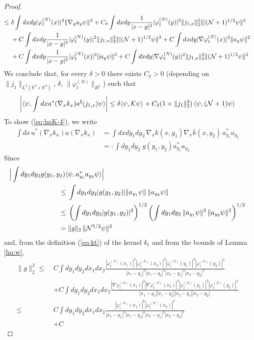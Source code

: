\documentclass[11pt,a4paper,DIV11]{scrartcl}	%
\newcommand{\bR}{{\mathbb R}}
\newcommand{\cK}{{\cal K}}
\newcommand{\cN}{{\cal N}}
\begin{document}
\begin{proof}
\[\begin{split}
\leq \; &\delta \int dx dy |\varphi_t^{(N)} (x)|^2 \| \nabla_y a_y \psi \|^2 + C_\delta \int dx dy \frac{1}{|x-y|^2} |\varphi^{(N)}_t (y)|^2 \|j_{1,x}\|_2^2 \| |(\cN+1)^{1/2} \psi \|^2 \\ &
+C \int dx dy \frac{1}{|x-y|^2} |\varphi^{(N)}_t (y)|^2 \|j_{1,x}\|_2^2 \| |(\cN+1)^{1/2} \psi \|^2 + 
C \int dx dy | \nabla \varphi_t^{(N)} (x)|^2 \| a_y \psi \|^2 \\
&+C\int dx dy \frac{1}{|x-y|^2} |\varphi_t^{(N)} (x)|^2 \| a_y \psi \|^2 
+ C \int dx dy |\nabla \varphi_t^{(N)} (y)|^2  \|j_{1,x} \|_2^2 \| (\cN+1)^{1/2} \psi \|^2 \end{split} \]
We conclude that, for every $\delta >0$ there exists $C_\delta > 0$ (depending on $ \| j_1 \|_{L^2 (\bR^3 \times \bR^3)}$, $\delta$, $\| \varphi_t^{(N)} \|_{H^1}$) such that 
\[ \left| \langle \psi , \int dx a^* (\nabla_x k_x) a^\sharp (j_{1,x}) \psi \rangle \right| \leq \delta \langle \psi , \cK \psi \rangle + C_\delta (1+  \| j_1 \|_2^2 ) \, \langle \psi , (\cN + 1) \psi \rangle \]
To show (\ref{eq:lmK-4}), we write
\[  \begin{split} \int dx  \, a^* (\nabla_x k_x) a (\nabla_x k_x) & = \int dx dy_1 dy_2 \, \nabla_x k (x,y_1) \nabla_x \overline{k} (x,y_2) \, a_{y_1}^* a_{y_2} \\ & =: \int dy_1 dy_2 \; g (y_1, y_2) a_{y_1}^* a_{y_2} \end{split} \]
Since
\[ \begin{split} \Big| \int dy_1 dy_2 g (y_1 , y_2) \langle &\psi , a_{y_1}^* a_{y_2} \psi \rangle \Big| \\ \leq \; & \int dy_1 dy_2 |g (y_1 , y_2)| \| a_{y_1} \psi \| \, \|  a_{y_2} \psi \| \\ \leq  \; & \left(\int dy_1 dy_2 |g (y_1 , y_2)|^2 \right)^{1/2}  \left( \int dy_1 dy_2 \, \| a_{y_1} \psi \|^2 \, \|  a_{y_2} \psi \|^2 \right)^{1/2} \\ = \; & \| g \|_2 \, \| \cN^{1/2} \psi \|^2 \end{split} \] 
and, from the definition (\ref{eq:kt}) of the kernel $k_t$ and from the bounds of Lemma \ref{lm:w}, 
\[ \begin{split} \| g \|_2^2 \leq \; &C \int dy_1 dy_2 dx_1 dx_2  \frac{|\varphi_t^{(N)} (x_1)|^2 |\varphi_t^{(N)} (x_2)|^2 |\varphi_t^{(N)} (y_1)|^2 |\varphi_t^{(N)} (y_2)|^2}{|x_1 - y_1|^2 |x_1 - y_2|^2 |x_2-y_1|^2 |x_2 - y_2|^2}  \\ &+C \int dy_1 dy_2 dx_1 dx_2 \frac{|\nabla \varphi_t^{(N)} (x_1)|^2 |\nabla \varphi_t^{(N)} (x_2)|^2 |\varphi_t^{(N)} (y_1)|^2 |\varphi_t^{(N)} (y_2)|^2}{|x_1 - y_1| |x_1 - y_2| |x_2-y_1| |x_2 - y_2|} \\  \leq \;& C \int dy_1 dy_2 dx_1 dx_2  \frac{|\varphi_t^{(N)} (x_1)|^6 |\varphi_t^{(N)} (x_2)|^2}{|x_1 - y_1|^2 |x_1 - y_2|^2 |x_2-y_1|^2 |x_2 - y_2|^2} \\ &+C 

\end{split}\]
\end{proof}
\end{document}
